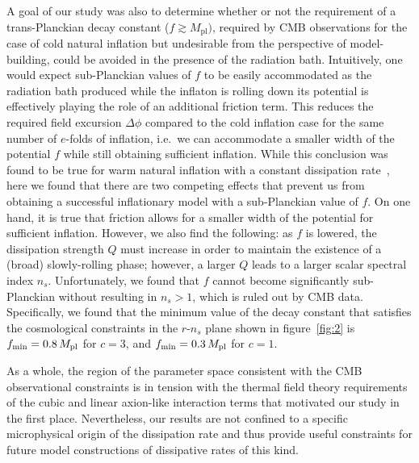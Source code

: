 \documentclass[a4paper,11pt]{article}
\begin{document}
A goal of our study was also to determine whether or not the requirement of a trans-Planckian decay constant ($f\gtrsim M_{\mathrm{pl}})$, required by CMB observations for the case of cold natural inflation but undesirable from the perspective of model-building, could be avoided in the presence of the radiation bath. Intuitively, one would expect sub-Planckian values of $f$ to be easily accommodated as the radiation bath produced while the inflaton is rolling down its potential is effectively playing the role of an additional friction term. This reduces the required field excursion $\Delta \phi$ compared to the cold inflation case for the same number of $e$-folds of inflation, i.e.\ we can accommodate a smaller width of the potential $f$ while still obtaining sufficient inflation. While this conclusion was found to be true for warm natural inflation with a constant dissipation rate~\cite{Visinelli:2011jy}, here we found that there are two competing effects that prevent us from obtaining a successful inflationary model with a sub-Planckian value of $f$. On one hand, it is true that friction allows for a smaller width of the potential for sufficient inflation. However, we also find the following: as $f$ is lowered, the dissipation strength $Q$ must increase in order to maintain the existence of a (broad) slowly-rolling phase; however, a larger $Q$ leads to a larger scalar spectral index $n_s$. Unfortunately, we found that $f$ cannot become significantly sub-Planckian without resulting in $n_s>1$, which is ruled out by CMB data. Specifically, we found that the minimum value of the decay constant that satisfies the cosmological constraints in the $r$-$n_s$ plane shown in figure~\ref{fig:2} is $f_{\rm min} = 0.8\,M_{\mathrm{pl}}$ for $c=3$, and $f_{\rm min} = 0.3\,M_{\mathrm{pl}}$ for $c=1$. 

As a whole, the region of the parameter space consistent with the CMB observational constraints is in tension with the thermal field theory requirements of the cubic and linear axion-like interaction terms that motivated our study in the first place. Nevertheless, our results are not confined to a specific microphysical origin of the dissipation rate and thus provide useful constraints for future model constructions of dissipative rates of this kind.
\end{document}
